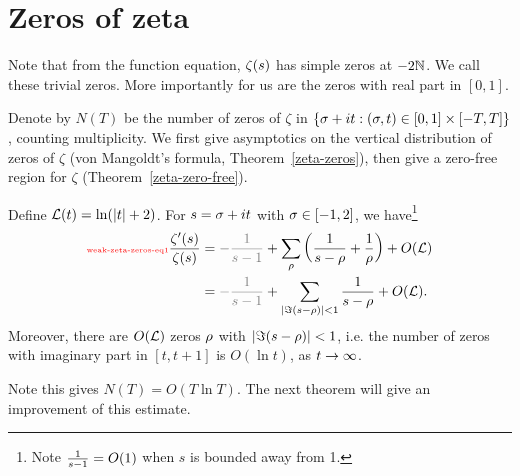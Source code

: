 \section{Zeros of zeta}
Note that from the function equation, $\ze(s)$ has simple zeros at $-2\N$. We call these trivial zeros. More importantly for us are the zeros with real part in $[0,1]$.

Denote by $N(T)$ be the number of zeros of $\zeta$ in $\set{\si+it}{(\si,t)\in [0,1]\times [-T,T]}$, counting multiplicity. We first give asymptotics on the vertical distribution of zeros of $\zeta$ (von Mangoldt's formula, Theorem~\ref{zeta-zeros}), then give a zero-free region for $\zeta$ (Theorem~\ref{zeta-zero-free}).
\begin{lem}
Define $\cal L(t)=\ln (|t|+2)$. 
For $s=\si+it$ with $\si\in [-1,2]$, we have\footnote{Note $\rc{s-1}=O(1)$ when $s$ is bounded away from 1.}
\begin{align}
\llabel{weak-zeta-zeros-eq1}
\frac{\zeta'(s)}{\zeta(s)}
&={\color{gray}-\rc{s-1}}
+\sum_{\rh}\pa{\rc{s-\rh}+\rc{\rh}}+O(\cal L)\\
\nonumber
&={\color{gray}-\rc{s-1}}
+\sum_{|\Im(s-\rh)|<1} \rc{s-\rh} +O(\cal L).
\end{align}
Moreover, there are $O(\cal L)$ zeros $\rh$ with $|\Im(s-\rh)|<1$, i.e. the number of zeros with imaginary part in $[t,t+1]$ is $O(\ln t)$, as $t\to \iy$.
\end{lem}
Note this gives $N(T)=O(T\ln T)$. The next theorem will give an improvement of this estimate.
